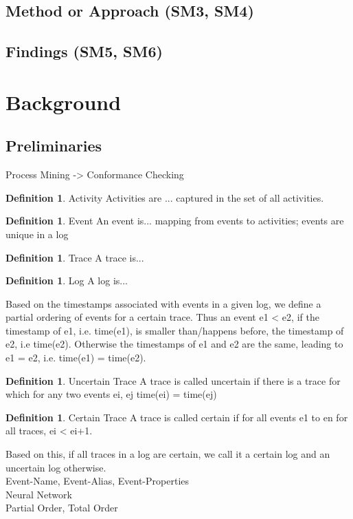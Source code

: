 \documentclass[
	a4paper,
	pagesize,
	pdftex,
	12pt,
	ngerman,
	fleqn,
	final,
	]{scrartcl}
\theoremstyle{plain}
\theoremstyle{definition}
\newtheorem{defn}[thm]{Definition}
\begin{document}
	\subsection{Method or Approach (SM3, SM4)}\label{sec:introduction::method}
	
	\subsection{Findings (SM5, SM6)}\label{sec:introduction::results}

\section{Background}
	\subsection{Preliminaries}
		Process Mining -> Conformance Checking \\
		\begin{defn}{Activity}
			Activities are ... captured in the set of all activities.
		\end{defn}
		\begin{defn}{Event}
			An event is... mapping from events to activities; events are unique in a log
		\end{defn}
		\begin{defn}{Trace}
			A trace is...
		\end{defn}
		\begin{defn}{Log}
			A log is...
		\end{defn}
		Based on the timestamps associated with events in a given log, we define a partial ordering of events for a certain trace. Thus an event e1 < e2, if the timestamp of e1, i.e. time(e1), is smaller than/happens before, the timestamp of e2, i.e time(e2). Otherwise the timestamps of e1 and e2 are the same, leading to e1 = e2, i.e. time(e1) = time(e2).
		\begin{defn}{Uncertain Trace}
			A trace is called uncertain if there is a trace for which for any two events ei, ej time(ei) = time(ej)
		\end{defn}
		\begin{defn}{Certain Trace}
			A trace is called certain if for all events e1 to en for all traces, ei < ei+1.
		\end{defn}
		Based on this, if all traces in a log are certain, we call it a certain log and an uncertain log otherwise. \\
		Event-Name, Event-Alias, Event-Properties \\
		Neural Network \\
		Partial Order, Total Order \\ 
	
\end{document}
